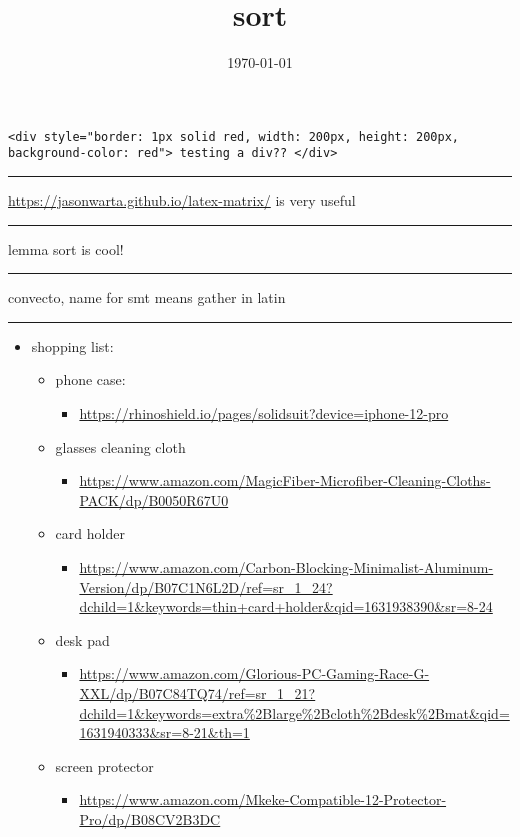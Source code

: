 \documentclass[letterpaper]{article}
\date{\today}
\title{sort}
\renewcommand\maketitle{}
\begin{document}
\maketitle
\begin{verbatim}
<div style="border: 1px solid red, width: 200px, height: 200px, background-color: red"> testing a div?? </div>
\end{verbatim}

\noindent\rule{\textwidth}{0.5pt}

\url{https://jasonwarta.github.io/latex-matrix/} is very useful

\noindent\rule{\textwidth}{0.5pt}

lemma sort is cool!

\noindent\rule{\textwidth}{0.5pt}

convecto, name for smt means gather in latin

\noindent\rule{\textwidth}{0.5pt}

\begin{itemize}
\item shopping list:

\begin{itemize}
\item phone case:

\begin{itemize}
\item \url{https://rhinoshield.io/pages/solidsuit?device=iphone-12-pro}
\end{itemize}

\item glasses cleaning cloth

\begin{itemize}
\item \url{https://www.amazon.com/MagicFiber-Microfiber-Cleaning-Cloths-PACK/dp/B0050R67U0}
\end{itemize}

\item card holder

\begin{itemize}
\item \url{https://www.amazon.com/Carbon-Blocking-Minimalist-Aluminum-Version/dp/B07C1N6L2D/ref=sr\_1\_24?dchild=1\&keywords=thin+card+holder\&qid=1631938390\&sr=8-24}
\end{itemize}

\item desk pad

\begin{itemize}
\item \url{https://www.amazon.com/Glorious-PC-Gaming-Race-G-XXL/dp/B07C84TQ74/ref=sr\_1\_21?dchild=1\&keywords=extra\%2Blarge\%2Bcloth\%2Bdesk\%2Bmat\&qid=1631940333\&sr=8-21\&th=1}
\end{itemize}

\item screen protector

\begin{itemize}
\item \url{https://www.amazon.com/Mkeke-Compatible-12-Protector-Pro/dp/B08CV2B3DC}
\end{itemize}
\end{itemize}
\end{itemize}
\end{document}
